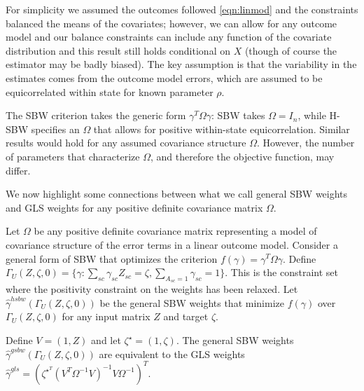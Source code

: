 \begin{remark}
    For simplicity we assumed the outcomes followed \eqref{eqn:linmod} and the constraints balanced the means of the covariates; however, we can allow for any outcome model and our balance constraints can include any function of the covariate distribution and this result still holds conditional on $X$ (though of course the estimator may be badly biased). The key assumption is that the variability in the estimates comes from the outcome model errors, which are assumed to be equicorrelated within state for known parameter $\rho$.
\end{remark}

\begin{remark}
    The SBW criterion takes the generic form $\gamma^T\Omega\gamma$: SBW takes $\Omega = I_n$, while H-SBW specifies an $\Omega$ that allows for positive within-state equicorrelation. Similar results would hold for any assumed covariance structure $\Omega$. However, the number of parameters that characterize $\Omega$, and therefore the objective function, may differ.
\end{remark}

We now highlight some connections between what we call general SBW weights and GLS weights for any positive definite covariance matrix $\Omega$.

\begin{proposition}\label{cl5}
    Let $\Omega$ be any positive definite covariance matrix representing a model of covariance structure of the error terms in a linear outcome model. Consider a general form of SBW that optimizes the criterion $f(\gamma) = \gamma^T\Omega\gamma$. Define $\Gamma_U(Z, \zeta, 0) = \{\gamma: \sum_{sc}\gamma_{sc}Z_{sc} = \zeta, \sum_{A_{sc} = 1}\gamma_{sc} = 1\}$. This is the constraint set where the positivity constraint on the weights has been relaxed. Let $\hat{\gamma}^{hsbw}(\Gamma_U(Z, \zeta, 0))$ be the general SBW weights that minimize $f(\gamma)$ over $\Gamma_U(Z, \zeta, 0)$ for any input matrix $Z$ and target $\zeta$.
    
    Define $V = (1, Z)$ and let $\zeta^\star = (1, \zeta)$. The general SBW weights $\hat{\gamma}^{gsbw}(\Gamma_U(Z, \zeta, 0))$ are equivalent to the GLS weights $\hat{\gamma}^{gls} = (\zeta^\star^T(V^T\Omega^{-1}V)^{-1}V\Omega^{-1})^T$. 
\end{proposition}

